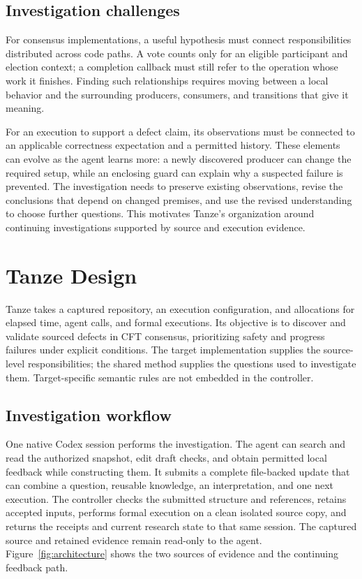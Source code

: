 \documentclass[10pt,twocolumn,letterpaper]{article}
\newcommand{\sys}{Tanze}
\begin{document}
\subsection{Investigation challenges}

For consensus implementations, a useful hypothesis must connect responsibilities distributed across code paths. A vote counts only for an eligible participant and election context; a completion callback must still refer to the operation whose work it finishes. Finding such relationships requires moving between a local behavior and the surrounding producers, consumers, and transitions that give it meaning.

For an execution to support a defect claim, its observations must be connected to an applicable correctness expectation and a permitted history. These elements can evolve as the agent learns more: a newly discovered producer can change the required setup, while an enclosing guard can explain why a suspected failure is prevented. The investigation needs to preserve existing observations, revise the conclusions that depend on changed premises, and use the revised understanding to choose further questions. This motivates \sys{}'s organization around continuing investigations supported by source and execution evidence.

\section{\sys{} Design}
\label{sec:design}

\sys{} takes a captured repository, an execution configuration, and allocations for elapsed time, agent calls, and formal executions. Its objective is to discover and validate sourced defects in CFT consensus, prioritizing safety and progress failures under explicit conditions. The target implementation supplies the source-level responsibilities; the shared method supplies the questions used to investigate them. Target-specific semantic rules are not embedded in the controller.

\subsection{Investigation workflow}
\label{sec:overview}

One native Codex session performs the investigation. The agent can search and read the authorized snapshot, edit draft checks, and obtain permitted local feedback while constructing them. It submits a complete file-backed update that can combine a question, reusable knowledge, an interpretation, and one next execution. The controller checks the submitted structure and references, retains accepted inputs, performs formal execution on a clean isolated source copy, and returns the receipts and current research state to that same session. The captured source and retained evidence remain read-only to the agent. Figure~\ref{fig:architecture} shows the two sources of evidence and the continuing feedback path.
\end{document}
